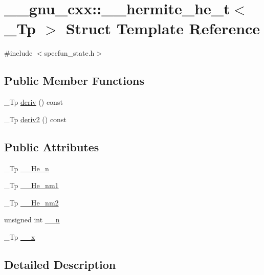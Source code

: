 \hypertarget{struct____gnu__cxx_1_1____hermite__he__t}{}\section{\+\_\+\+\_\+gnu\+\_\+cxx\+:\+:\+\_\+\+\_\+hermite\+\_\+he\+\_\+t$<$ \+\_\+\+Tp $>$ Struct Template Reference}
\label{struct____gnu__cxx_1_1____hermite__he__t}


{\ttfamily \#include $<$specfun\+\_\+state.\+h$>$}

\subsection*{Public Member Functions}
\begin{DoxyCompactItemize}
\item 
\+\_\+\+Tp \hyperlink{struct____gnu__cxx_1_1____hermite__he__t_a19c1df6940043e1b106b8cf70bddd60e}{deriv} () const
\item 
\+\_\+\+Tp \hyperlink{struct____gnu__cxx_1_1____hermite__he__t_a4d885a96a96b12e9e8b6ad62628cfff3}{deriv2} () const
\end{DoxyCompactItemize}
\subsection*{Public Attributes}
\begin{DoxyCompactItemize}
\item 
\+\_\+\+Tp \hyperlink{struct____gnu__cxx_1_1____hermite__he__t_ad1a90d0045c4fe567482ebd8cf875842}{\+\_\+\+\_\+\+He\+\_\+n}
\item 
\+\_\+\+Tp \hyperlink{struct____gnu__cxx_1_1____hermite__he__t_a954844caba412a30632beb4263862e44}{\+\_\+\+\_\+\+He\+\_\+nm1}
\item 
\+\_\+\+Tp \hyperlink{struct____gnu__cxx_1_1____hermite__he__t_a1df5a7d99880aae14ee9966bbe1b1179}{\+\_\+\+\_\+\+He\+\_\+nm2}
\item 
unsigned int \hyperlink{struct____gnu__cxx_1_1____hermite__he__t_afc26c586970d8d48a18f45450a7efcb4}{\+\_\+\+\_\+n}
\item 
\+\_\+\+Tp \hyperlink{struct____gnu__cxx_1_1____hermite__he__t_a24b66f5153ce3e231976e18b4eccb2a0}{\+\_\+\+\_\+x}
\end{DoxyCompactItemize}


\subsection{Detailed Description}
